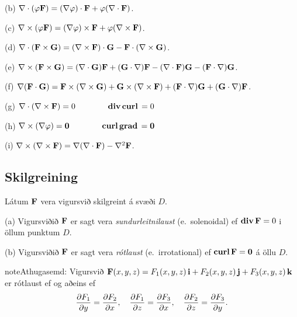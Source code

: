 \documentclass[a4paper,10pt,icelandic]{sphinxmanual}
\begin{document}
(b)
\(\nabla\cdot(\varphi\mbox{${\bf F}$})=(\nabla\varphi)\cdot\mbox{${\bf F}$}+\varphi(\nabla\cdot\mbox{${\bf F}$})\).

(c)
\(\nabla\times(\varphi\mbox{${\bf F}$})=(\nabla\varphi)\times\mbox{${\bf F}$}+\varphi(\nabla\times\mbox{${\bf F}$})\).

(d)
\(\nabla\cdot(\mbox{${\bf F}$}\times\mbox{${\bf G}$})=(\nabla\times\mbox{${\bf F}$})\cdot\mbox{${\bf G}$}-\mbox{${\bf F}$}\cdot(\nabla\times\mbox{${\bf G}$})\).

(e)
\(\nabla\times(\mbox{${\bf F}$}\times\mbox{${\bf G}$})=(\nabla\cdot\mbox{${\bf G}$})\mbox{${\bf F}$}+(\mbox{${\bf G}$}\cdot\nabla)\mbox{${\bf F}$}-(\nabla\cdot\mbox{${\bf F}$})\mbox{${\bf G}$}-(\mbox{${\bf F}$}\cdot\nabla)\mbox{${\bf G}$}\).

(f)
\(\nabla(\mbox{${\bf F}$}\cdot\mbox{${\bf G}$})=\mbox{${\bf F}$}\times(\nabla\times \mbox{${\bf G}$})+\mbox{${\bf G}$}\times(\nabla\times \mbox{${\bf F}$})+(\mbox{${\bf F}$}\cdot\nabla)\mbox{${\bf G}$}+(\mbox{${\bf G}$}\cdot\nabla)\mbox{${\bf F}$}\).

(g)
\(\nabla\cdot(\nabla\times \mbox{${\bf F}$})=0\qquad\qquad\mbox{${\rm\bf div\,}$}\mbox{${\rm\bf curl\,}$}=0\)

(h)
\(\nabla\times(\nabla\varphi)=\mbox{${\bf 0}$}\qquad\qquad\mbox{${\rm\bf curl\,}$}\mbox{${\rm\bf grad\,}$}=\mbox{${\bf 0}$}\)

(i)
\(\nabla\times(\nabla\times \mbox{${\bf F}$})=\nabla(\nabla\cdot\mbox{${\bf F}$})-\nabla^2\mbox{${\bf F}$}\).


\subsection{Skilgreining}
\label{Kafli6:id3}
Látum \(\mbox{${\bf F}$}\) vera vigursvið skilgreint á svæði
\(D\).

(a) Vigursviðið \(\mbox{${\bf F}$}\) er sagt vera
\emph{sundurleitnilaust} (e. solenoidal) ef
\(\mbox{${\rm\bf div\,}$}\mbox{${\bf F}$}=0\) i öllum punktum
\(D\).

(b) Vigursviðið \(\mbox{${\bf F}$}\) er sagt vera \emph{rótlaust}
(e. irrotational) ef
\(\mbox{${\rm\bf curl\,}$}\mbox{${\bf F}$}=\mbox{${\bf 0}$}\) á öllu
\(D\).

\begin{notice}{note}{Athugasemd:}
Vigursvið \(\mbox{${\bf F}$}(x,y,z)=F_1(x,y,z)\,\mbox{${\bf i}$}+F_2(x,y,z)\,\mbox{${\bf j}$}+F_3(x,y,z)\,\mbox{${\bf k}$}\) er rótlaust ef og aðeins ef
\begin{gather}
\begin{split}\displaystyle
\frac{\partial F_1}{\partial y}=
\frac{\partial F_2}{\partial x},\quad
\frac{\partial F_1}{\partial z}=
\frac{\partial F_3}{\partial x},\quad
\frac{\partial F_2}{\partial z}=
\frac{\partial F_3}{\partial y}.\end{split}\notag
\end{gather}\end{notice}
\end{document}
